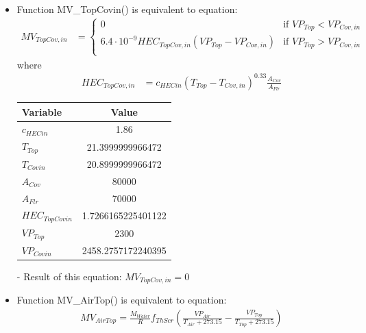 \documentclass[a4paper]{article}
\numberwithin{equation}{section}
\begin{document}
\begin{itemize}
  \item Function MV\_TopCovin() is equivalent to equation:
        \begin{align*}
          MV_{TopCov,in} & = \begin{cases}
            0                                                         & \text{if~} VP_{Top} < VP_{Cov,in} \\
            6.4 \cdot 10^{-9} HEC_{TopCov,in}(VP_{Top} - VP_{Cov,in}) & \text{if~} VP_{Top} > VP_{Cov,in} \\
          \end{cases}
        \end{align*}
        where
        \begin{align*}
          HEC_{TopCov,in} & = {c_{HECin} (T_{Top} - T_{Cov,in})}^{0.33} \frac{A_{Cov}}{A_{Flr}}
        \end{align*}

        \begin{table}[H]
          \centering
          \begin{tabular}{@{}lS[table-format=4.17]@{}}
            \toprule
            \textbf{Variable}  & \textbf{Value}     \\
            \midrule
            \(c_{HECin}\)      & 1.86               \\
            \(T_{Top}\)        & 21.3999999966472   \\
            \(T_{Covin}\)      & 20.8999999966472   \\
            \(A_{Cov}\)        & 80000              \\
            \(A_{Flr}\)        & 70000              \\
            \(HEC_{TopCovin}\) & 1.7266165225401122 \\
            \(VP_{Top}\)       & 2300               \\
            \(VP_{Covin}\)     & 2458.2757172240395 \\
            \bottomrule
          \end{tabular}
        \end{table}

  \item[-] Result of this equation: \(MV_{TopCov,in} = 0\)

  \item Function MV\_AirTop() is equivalent to equation:
        \begin{align*}
          MV_{AirTop}  = \frac{M_{Water}}{R} f_{ThScr} (\frac{VP_{Air}}{T_{Air} + 273.15} - \frac{VP_{Top}}{T_{Top} + 273.15})
        \end{align*}


\end{itemize}
\end{document}
